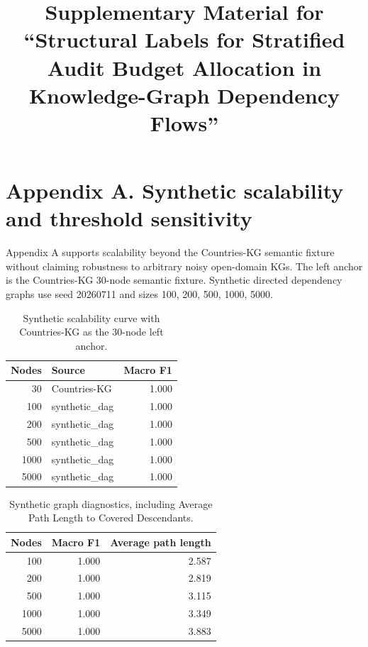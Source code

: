 \documentclass[pdflatex,sn-mathphys-num]{sn-jnl}
\begin{document}
\title[Supplementary Material]{Supplementary Material for ``Structural Labels for Stratified Audit Budget Allocation in Knowledge-Graph Dependency Flows''}
\author*[1]{ }
\maketitle

\section{Appendix A. Synthetic scalability and threshold sensitivity}

Appendix A supports scalability beyond the Countries-KG semantic fixture without claiming robustness to arbitrary noisy open-domain KGs. The left anchor is the Countries-KG 30-node semantic fixture. Synthetic directed dependency graphs use seed 20260711 and sizes 100, 200, 500, 1000, 5000.

\begin{table}[h]
\caption{Synthetic scalability curve with Countries-KG as the 30-node left anchor.}
\centering
\small
\begin{tabular}{rlr}
\toprule
\textbf{Nodes} & \textbf{Source} & \textbf{Macro F1} \\
\midrule
30 & Countries-KG & 1.000 \\
100 & synthetic\_dag & 1.000 \\
200 & synthetic\_dag & 1.000 \\
500 & synthetic\_dag & 1.000 \\
1000 & synthetic\_dag & 1.000 \\
5000 & synthetic\_dag & 1.000 \\
\bottomrule
\end{tabular}
\end{table}

\begin{table}[h]
\caption{Synthetic graph diagnostics, including Average Path Length to Covered Descendants.}
\centering
\small
\begin{tabular}{rrr}
\toprule
\textbf{Nodes} & \textbf{Macro F1} & \textbf{Average path length} \\
\midrule
100 & 1.000 & 2.587 \\
200 & 1.000 & 2.819 \\
500 & 1.000 & 3.115 \\
1000 & 1.000 & 3.349 \\
5000 & 1.000 & 3.883 \\
\bottomrule
\end{tabular}
\end{table}
\end{document}
